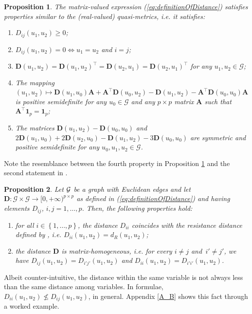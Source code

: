 \documentclass[12pt]{article}
\theoremstyle{plain}
\newtheorem{proposition}{Proposition}
\theoremstyle{remark}
\newcommand{\curly}[1]{\left\{ #1 \right\}}
\newcommand{\onep}[0]{{\mathbf{1}_{p}}}
\newcommand{\ie}{\textit{i.e. }}
\newcommand{\latMatr}[1]{\mathbf{#1}}          %
\newcommand{\tobi}[1]{\textcolor{teal}{#1}}
\begin{document}
    \begin{proposition}
        \label{prop:actuallyQuasiMetricSpace}
        The matrix-valued expression (\ref{eq:definitionOfDistance}) satisfies properties similar to the (real-valued) quasi-metrics, \ie it satisfies:
        \begin{enumerate}
            \item $D_{ij}(u_1,u_2)\geq 0$;
            \item $D_{ij}(u_1,u_2)=0 \iff u_1=u_2$ and $i=j$;
            \item $\latMatr{D}(u_1,u_2) = \latMatr{D}(u_1,u_2)^\top = \latMatr{D}(u_2,u_1) = \latMatr{D}(u_2,u_1)^\top$ for any $u_1, u_2 \in \mathcal G$;
            \item The mapping $(u_1,u_2) \mapsto \latMatr{D}(u_1,u_0) \latMatr{A} + \latMatr{A}^\top \latMatr{D}(u_0,u_2) - \latMatr{D}(u_1,u_2) - \latMatr{A}^\top \latMatr{D}(u_0,u_0) \latMatr{A}$ is positive semidefinite for any $u_0 \in \mathcal G$ and any $p\times p$ matrix $\latMatr{A}$ such that $\latMatr{A}^\top \onep = \onep$;
            \item {The matrices $\latMatr{D}(u_1,u_2)-\latMatr{D}(u_0,u_0)$ and  $2\latMatr{D}(u_1,u_0)+2\latMatr{D}(u_2,u_0)-\latMatr{D}(u_1,u_2)-3\latMatr{D}(u_0,u_0)$ are symmetric and positive semidefinite for any $u_0,u_1,u_2 \in \mathcal G$.}
        \end{enumerate}
    \end{proposition}
    {Note the resemblance between the fourth property in Proposition \ref{prop:actuallyQuasiMetricSpace} and the second statement in \citet[Proposition 4]{zastavnyi_analog_2023}.}
       
    \begin{proposition}
        \label{prop:ourDistProperties}
        Let ${\cal G}$ be a graph with Euclidean edges and let $\latMatr{D}: \mathcal G\times \mathcal G \to {[0,+\infty)}^{p\times p}$ as defined in (\ref{eq:definitionOfDistance}) and having elements $D_{ij}$, $i,j=1,\ldots, p$. Then, the following properties hold: 
        \begin{enumerate}
            \item for all $i\in\curly{1,\dots,p}$, the distance $D_{ii}$ coincides with the resistance distance defined by \cite{anderes_isotropic_2020}, \ie $D_{ii}(u_1,u_2)=d_{R}(u_1,u_2)$;
            \item the distance $\latMatr{D}$ is matrix-homogeneous, \ie for every $ i\ne j$ and $\,i'\ne j'$, we have $D_{ij}(u_1,u_2)=D_{i'j'}(u_1,u_2)$ and $D_{ii}(u_1,u_2)=D_{i'i'}(u_1,u_2)$.  %
        \end{enumerate}
    \end{proposition}
    Albeit counter-intuitive, the distance within the same variable is not always less than the same distance among variables. In formulae, $D_{ii}(u_1,u_2)\not\leq D_{ij}(u_1,u_2)$, in general. Appendix \ref{A_B} shows this fact through a worked example.
    
\end{document}
